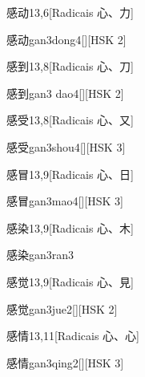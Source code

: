 \begin{entry}{感动}{13,6}[Radicais ⼼、⼒]
  \begin{phonetics}{感动}{gan3dong4}[][HSK 2]
  \end{phonetics}
\end{entry}

\begin{entry}{感到}{13,8}[Radicais ⼼、⼑]
  \begin{phonetics}{感到}{gan3 dao4}[][HSK 2]
  \end{phonetics}
\end{entry}

\begin{entry}{感受}{13,8}[Radicais ⼼、⼜]
  \begin{phonetics}{感受}{gan3shou4}[][HSK 3]
  \end{phonetics}
\end{entry}

\begin{entry}{感冒}{13,9}[Radicais ⼼、⽇]
  \begin{phonetics}{感冒}{gan3mao4}[][HSK 3]
  \end{phonetics}
\end{entry}

\begin{entry}{感染}{13,9}[Radicais ⼼、⽊]
  \begin{phonetics}{感染}{gan3ran3}
  \end{phonetics}
\end{entry}

\begin{entry}{感觉}{13,9}[Radicais ⼼、⾒]
  \begin{phonetics}{感觉}{gan3jue2}[][HSK 2]
  \end{phonetics}
\end{entry}

\begin{entry}{感情}{13,11}[Radicais ⼼、⼼]
  \begin{phonetics}{感情}{gan3qing2}[][HSK 3]
  \end{phonetics}
\end{entry}

